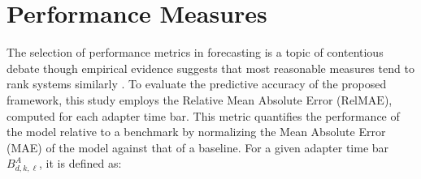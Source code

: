 \documentclass{rQUF2e}
\theoremstyle{plain}
\theoremstyle{definition}
\theoremstyle{remark}
\begin{document}




\section{Performance Measures}
\label{sec:performance_measures}

The selection of performance metrics in forecasting is a topic of contentious debate though empirical evidence suggests that most reasonable measures tend to rank systems similarly \citep{Koutsandreas2021}. To evaluate the predictive accuracy of the proposed framework, this study employs the Relative Mean Absolute Error ($\mathrm{RelMAE}$), computed for each adapter time bar. This metric quantifies the performance of the model relative to a benchmark by normalizing the Mean Absolute Error (MAE) of the model against that of a baseline. For a given adapter time bar $B^A_{d, k, \ell}$, it is defined as:
\end{document}
